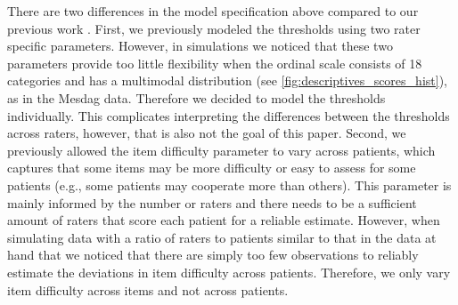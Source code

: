 \documentclass[a4paper,11pt]{article}
\newcommand{\DB}[1]{\todo[inline, color=colorDon]{DB: {#1}}}
\begin{document}
There are two differences in the model specification above compared to our previous work \parencite{vandenBergh2020cultural}.
First, we previously modeled the thresholds using two rater specific parameters.
However, in simulations we noticed that these two parameters provide too little flexibility when the ordinal scale consists of 18 categories and has a multimodal distribution (see \autoref{fig:descriptives_scores_hist}), as in the Mesdag data.
Therefore we decided to model the thresholds individually.
This complicates interpreting the differences between the thresholds across raters, however, that is also not the goal of this paper.
Second, we previously allowed the item difficulty parameter to vary across patients, which captures that some items may be more difficulty or easy to assess for some patients (e.g., some patients may cooperate more than others).
This parameter is mainly informed by the number or raters and there needs to be a sufficient amount of raters that score each patient for a reliable estimate.
However, when simulating data with a ratio of raters to patients similar to that in the data at hand that we noticed that there are simply too few observations to reliably estimate the deviations in item difficulty across patients.
Therefore, we only vary item difficulty across items and not across patients. 


%
%
%
%
%
\end{document}
